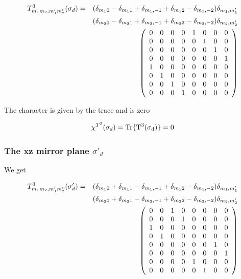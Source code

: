 \begin{eqnarray}\label{sd3}
T^3_{m_1m_2,m'_1m'_2}(\sigma_d)&=&(\delta_{m_10}-\delta_{m_11}+\delta_{m_1,-1}+\delta_{m_12}-\delta_{m_1,-2})
\delta_{m_1,m'_1}\\ \nonumber
&&(\delta_{m_20}-\delta_{m_21}+\delta_{m_2,-1}+\delta_{m_22}-\delta_{m_2,-2})
\delta_{m_2,m'_2}\\ \nonumber
&&\left (
\begin{array}{ccccccccc}
0 & 0 & 0 & 0 & 1 & 0 & 0 & 0\\
0 & 0 & 0 & 0 & 0 & 1 & 0 & 0\\
0 & 0 & 0 & 0 & 0 & 0 & 1 & 0\\
0 & 0 & 0 & 0 & 0 & 0 & 0 & 1\\ 
1 & 0 & 0 & 0 & 0 & 0 & 0 & 0\\ 
0 & 1 & 0 & 0 & 0 & 0 & 0 & 0\\ 
0 & 0 & 1 & 0 & 0 & 0 & 0 & 0\\ 
0 & 0 & 0 & 1 & 0 & 0 & 0 & 0\\ 
\end{array} \right )
\end{eqnarray}

The character is given by the trace and is zero

\begin{equation}
\chi^{T^3}(\sigma_d)=\rm Tr \{ T^3(\sigma_d) \}=0
\end{equation}


\subsubsection{The xz mirror plane  $\sigma'_d$}

We get

\begin{eqnarray}\label{sdd3}
T^3_{m_1m_2,m'_1m'_2}(\sigma'_d)&=&(\delta_{m_10}+\delta_{m_11}-\delta_{m_1,-1}+\delta_{m_12}-\delta_{m_1,-2})
\delta_{m_1,m'_1}\\ \nonumber
&&(\delta_{m_20}+\delta_{m_21}-\delta_{m_2,-1}+\delta_{m_22}-\delta_{m_2,-2})
\delta_{m_2,m'_2}\\ \nonumber
&&\left (
\begin{array}{ccccccccc}
0 & 0 & 1 & 0 & 0 & 0 & 0 & 0\\
0 & 0 & 0 & 1 & 0 & 0 & 0 & 0\\
1 & 0 & 0 & 0 & 0 & 0 & 0 & 0\\
0 & 1 & 0 & 0 & 0 & 0 & 0 & 0\\ 
0 & 0 & 0 & 0 & 0 & 0 & 1 & 0\\ 
0 & 0 & 0 & 0 & 0 & 0 & 0 & 1\\ 
0 & 0 & 0 & 0 & 1 & 0 & 0 & 0\\ 
0 & 0 & 0 & 0 & 0 & 1 & 0 & 0\\ 
\end{array} \right )
\end{eqnarray}

